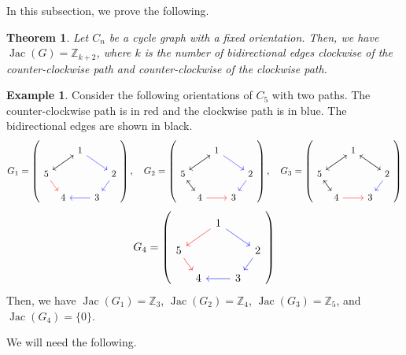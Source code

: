 \documentclass[11pt,reqno]{amsart}
\DeclareMathOperator{\Jac}{Jac}
\theoremstyle{definition}
\newtheorem{myeg}[mydef]{Example}
\theoremstyle{plain}
\newtheorem{mythm}[mydef]{Theorem}
\begin{document}
In this subsection, we prove the following. 

\begin{mythm}\label{theorem: two path}
Let $C_n$ be a cycle graph with a fixed orientation. Then, we have $\Jac(G)=\mathbb{Z}_{k+2}$, where $k$ is the number of bidirectional edges clockwise of the counter-clockwise path and counter-clockwise of the clockwise path.
\end{mythm}

\begin{myeg}
Consider the following orientations of $C_5$ with two paths. The counter-clockwise path is in red and the clockwise path is in blue.
The bidirectional edges are shown in black.
\[
G_1=\left( \begin{tikzcd}[row sep=0.4cm, column sep=0.15cm]
	& & 1 \arrow[drr,blue] \arrow[dll]& &  \\
	5 \arrow[urr] \arrow[dr,red] & & & & 2 \arrow[dl,blue] \\
	& 4& & 3 \arrow[ll,blue]& \end{tikzcd} \right),
\quad G_2=\left( \begin{tikzcd}[row sep=0.4cm, column sep=0.15cm]
& & 1 \arrow[drr,blue] \arrow[dll]& &  \\
5 \arrow[urr] \arrow[dr] & & & & 2 \arrow[dl,blue] \\
& 4\arrow[rr,red]\arrow[ul] & & 3 &
\end{tikzcd} \right),
\quad G_3=\left( \begin{tikzcd}[row sep=0.4cm, column sep=0.15cm]
& & 1 \arrow[drr] \arrow[dll]& &  \\
5 \arrow[urr] \arrow[dr] & & & & 2 \arrow[dl,blue] \arrow[ull] \\
& 4\arrow[rr,red]\arrow[ul] & & 3 &
\end{tikzcd} \right)
\]
\[
G_4=\left( \begin{tikzcd}[row sep=0.4cm, column sep=0.15cm]
& & 1 \arrow[drr,blue] \arrow[dll,red]& &  \\
5  \arrow[dr,red] & & & & 2 \arrow[dl,blue] \\
& 4 & & 3 \arrow[ll,blue]&
\end{tikzcd} \right)
\]
Then, we have $\Jac(G_1)=\mathbb{Z}_3$, $\Jac(G_2)=\mathbb{Z}_4$, $\Jac(G_3)=\mathbb{Z}_5$, and $\Jac(G_4)=\{0\}$.
\end{myeg}

We will need the following. 
\end{document}
